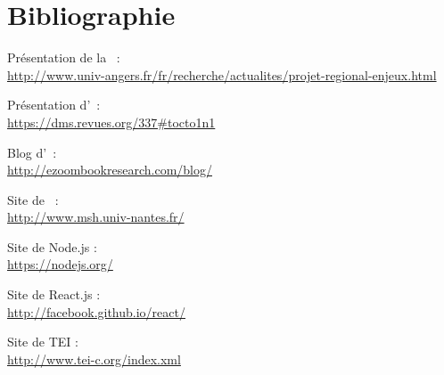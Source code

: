 \chapter*{Bibliographie}

Présentation de la \pe\ :\\
\url{http://www.univ-angers.fr/fr/recherche/actualites/projet-regional-enjeux.html}

Présentation d'\ezb\ :\\
\url{https://dms.revues.org/337#tocto1n1}

Blog d'\ezb\ :\\
\url{http://ezoombookresearch.com/blog/}

Site de \msh\ :\\
\url{http://www.msh.univ-nantes.fr/}

Site de Node.js :\\
\url{https://nodejs.org/}

Site de React.js :\\
\url{http://facebook.github.io/react/}

Site de TEI :\\
\url{http://www.tei-c.org/index.xml}